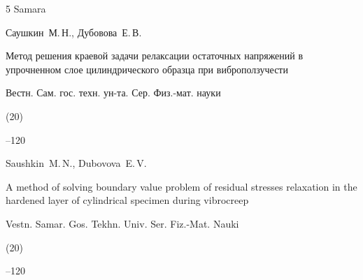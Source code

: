 \begin{thebibliography}{5}
\publaddr Samara




\by Саушкин~М.\,Н., Дубовова~Е.\,В.

\paper Метод решения краевой задачи релаксации остаточных напряжений в упрочненном слое цилиндрического образца при виброползучести

\jour Вестн. Сам. гос. техн. ун-та. Сер. Физ.-мат. науки


(20)

--120

\misctransl

\by Saushkin~M.\,N., Dubovova~E.\,V.

\paper A method of solving boundary value problem of residual stresses relaxation in the hardened layer of cylindrical specimen during vibrocreep

\jour Vestn. Samar. Gos. Tekhn. Univ. Ser. Fiz.-Mat. Nauki


(20)

--120



\end{thebibliography}



\noindent

\hskip6.5cm \thedate \par\noindent

\hskip6.5cm\therevdate



\vspace{-8mm}



\makeengtitle



\renewcommand{\baselinestretch}{0.9}



\newpage



%

